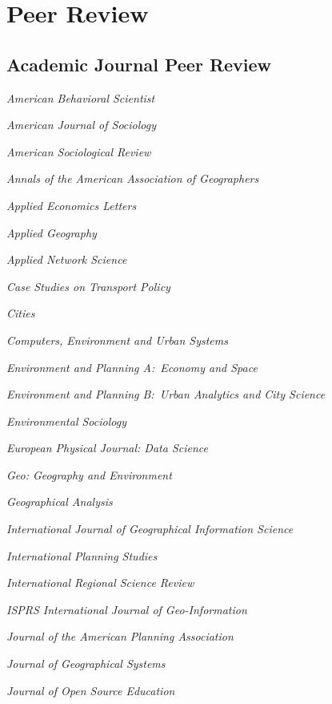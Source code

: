 \documentclass[11pt,a4paper]{report} %
\newcommand{\listitemspace}{0.25em}
\renewenvironment{itemize}
{
  \begin{list}{}{\setlength{\leftmargin}{0em}
      \setlength{\parskip}{0em}
      \setlength{\itemsep}{\listitemspace}
  \setlength{\parsep}{\listitemspace}}}
  {
\end{list}}
\begin{document}
\section*{Peer Review}

\subsection*{Academic Journal Peer Review}

\begin{itemize}

  \item \textit{American Behavioral Scientist}
  \item \textit{American Journal of Sociology}
  \item \textit{American Sociological Review}
  \item \textit{Annals of the American Association of Geographers}
  \item \textit{Applied Economics Letters}
  \item \textit{Applied Geography}
  \item \textit{Applied Network Science}
  \item \textit{Case Studies on Transport Policy}
  \item \textit{Cities}
  \item \textit{Computers, Environment and Urban Systems}
  \item \textit{Environment and Planning A:\ Economy and Space}
  \item \textit{Environment and Planning B:\ Urban Analytics and City Science}
  \item \textit{Environmental Sociology}
  \item \textit{European Physical Journal: Data Science}
  \item \textit{Geo: Geography and Environment}
  \item \textit{Geographical Analysis}
  \item \textit{International Journal of Geographical Information Science}
  \item \textit{International Planning Studies}
  \item \textit{International Regional Science Review}
  \item \textit{ISPRS International Journal of Geo-Information}
  \item \textit{Journal of the American Planning Association}
  \item \textit{Journal of Geographical Systems}
  \item \textit{Journal of Open Source Education}

\end{itemize}
\end{document}
